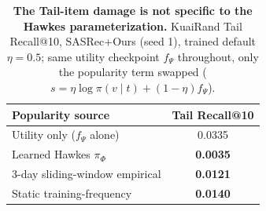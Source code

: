 \begin{table}[t]
\centering
\caption{\textbf{The Tail-item damage is not specific to the Hawkes parameterization.}
KuaiRand Tail Recall@10, SASRec+Ours (seed 1), trained default $\eta=0.5$; same utility
checkpoint $f_\Psi$ throughout, only the popularity term swapped
($s=\eta\log\pi(v\mid t)+(1-\eta)f_\Psi$).}
\label{tab:popularity_substitution}
\begin{tabular}{l c}
\toprule
Popularity source & Tail Recall@10 \\
\midrule
Utility only ($f_\Psi$ alone) & 0.0335 \\
Learned Hawkes $\pi_\Phi$ & \textbf{0.0035} \\
3-day sliding-window empirical & \textbf{0.0121} \\
Static training-frequency & \textbf{0.0140} \\
\bottomrule
\end{tabular}
\end{table}
